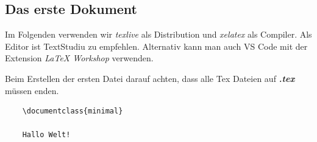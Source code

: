 \subsection{Das erste Dokument}
Im Folgenden verwenden wir \textit{texlive} als Distribution und \textit{xelatex} als Compiler.
Als Editor ist TextStudiu zu empfehlen. Alternativ kann man auch VS Code mit der Extension \textit{LaTeX Workshop} verwenden.

Beim Erstellen der ersten Datei darauf achten, dass alle Tex Dateien auf \textbf{\textit{.tex}} müssen enden.

\begin{verbatim}
    \documentclass{minimal}
    
    Hallo Welt!
    
\end{verbatim}

\newpage